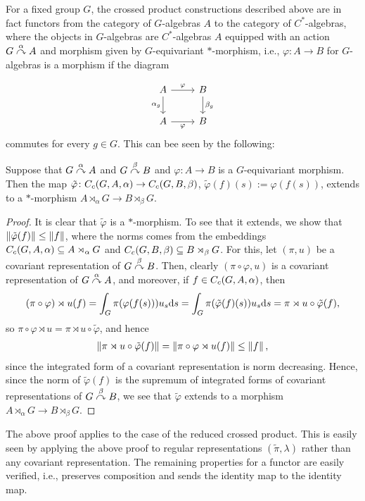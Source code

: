 For a fixed group $G$, the crossed product constructions described above are in fact functors from the category of $G$-algebras $A$ to the category of $C^*$-algebras, where the objects in $G$-algebras are $C^*$-algebras $A$ equipped with an action $G \stackrel{\alpha}{\curvearrowright} A$ and morphism given by $G$-equivariant $*$-morphism, i.e., $\varphi \colon A \to B$ for $G$-algebras is a morphism if the diagram

\begin{equation}
\begin{tikzcd}
	A \arrow[r, "\varphi"] \arrow[d, "\alpha_g"'] & B  \arrow[d, "\beta_g"]\\
	A \arrow[r, "\varphi"'] & B
\end{tikzcd}
\end{equation}
commutes for every $g \in G$. This can bee seen by the following:
\begin{proposition}
Suppose that $G \stackrel{\alpha}{\curvearrowright} A$ and $G \stackrel{\beta}{\curvearrowright} B$ and $\varphi \colon A \to B$ is a $G$-equivariant morphism. Then the map $\tilde \varphi \colon C_c(G,A,\alpha) \to C_c(G,B,\beta)$, $\tilde \varphi (f)(s) := \varphi(f(s))$, extends to a $*$-morphism $A \rtimes_\alpha G \to B \rtimes_\beta G$.
\end{proposition}
\begin{proof}
It is clear that $\tilde \varphi$ is a $*$-morphism. To see that it extends, we show that $\left\lVert \tilde \varphi(f) \right\rVert \leq \left\lVert f \right\rVert$, where the norms comes from the embeddings $C_c(G,A,\alpha) \subseteq A \rtimes_\alpha G$ and $C_c(G,B,\beta) \subseteq B \rtimes_\beta G$. For this, let $(\pi,u)$ be a covariant representation of $G \stackrel{\beta}{\curvearrowright} B$. Then, clearly $(\pi \circ \varphi , u)$ is a covariant representation of $G \stackrel{\alpha}{\curvearrowright} A$, and moreover, if $f \in C_c(G,A,\alpha)$, then
\begin{align*}
	(\pi \circ \varphi) \rtimes u(f) = \int_G \pi(\varphi(f(s))) u_s \mathrm{d} s = \int _G \pi (\tilde \varphi(f)(s)) u_s \mathrm{d} s  =  \pi \rtimes u \circ \tilde \varphi (f),
\end{align*}
so $\pi \circ \varphi \rtimes u = \pi \rtimes u \circ \tilde \varphi$, and hence 
\begin{align*}
	\left\lVert \pi \rtimes u \circ \tilde \varphi(f)\right\rVert = \left\lVert \pi \circ \varphi \rtimes u (f) \right\rVert \leq \left\lVert f \right\rVert,
\end{align*}
since the integrated form of a covariant representation is norm decreasing. Hence, since the norm of $ \tilde \varphi(f)$ is the supremum of integrated forms of covariant representations of $G \stackrel{\beta}{\curvearrowright} B$, we see that $\tilde \varphi$ extends to a morphism $A \rtimes_\alpha G \to B \rtimes_\beta G$.
\end{proof}
The above proof applies to the case of the reduced crossed product. This is easily seen by applying the above proof to regular representations $(\tilde \pi, \lambda)$ rather than any covariant representation. The remaining properties for a functor are easily verified, i.e., preserves composition and sends the identity map to the identity map.

